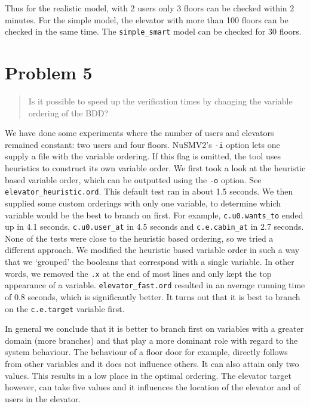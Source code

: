 \documentclass[a4paper,10pt]{article}
\begin{document}
	Thus for the realistic model, with 2 users only 3 floors can be checked within 2 minutes. For the simple model, the elevator with more than 100 floors can be checked in the same time. The \texttt{simple\_smart} model can be checked for 30 floors.
	
	\section{Problem 5}
	
	\begin{quote}
		Is it possible to speed up the verification times by changing the variable ordering of the BDD?
	\end{quote}
	
	We have done some experiments where the number of users and elevators remained constant: two users and four floors. NuSMV2's \texttt{-i} option lets one supply a file with the variable ordering. If this flag is omitted, the tool uses heuristics to construct its own variable order. We first took a look at the heuristic based variable order, which can be outputted using the \texttt{-o} option. See \texttt{elevator\_heuristic.ord}. This default test ran in about 1.5 seconds. We then supplied some custom orderings with only one variable, to determine which variable would be the best to branch on first. For example, \texttt{c.u0.wants\_to} ended up in 4.1 seconds, \texttt{c.u0.user\_at} in 4.5 seconds and \texttt{c.e.cabin\_at} in 2.7 seconds. None of the tests were close to the heuristic based ordering, so we tried a different approach. We modified the heuristic based variable order in such a way that we `grouped' the booleans that correspond with a single variable. In other words, we removed the \texttt{.x} at the end of most lines and only kept the top appearance of a variable. \texttt{elevator\_fast.ord} resulted in an average running time of 0.8 seconds, which is significantly better. It turns out that it is best to branch on the \texttt{c.e.target} variable first.
	
	In general we conclude that it is better to branch first on variables with a greater domain (more branches) and that play a more dominant role with regard to the system behaviour. The behaviour of a floor door for example, directly follows from other variables and it does not influence others. It can also attain only two values. This results in a low place in the optimal ordering. The elevator target however, can take five values and it influences the location of the elevator and of users in the elevator.
	
\end{document}
